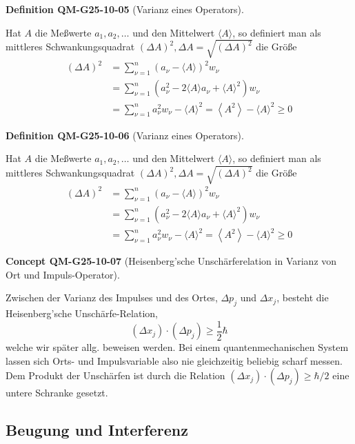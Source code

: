 \documentclass[10pt, letterpaper]{article}
\newcommand{\CustomHeading}[3]{%
  \par\medskip\noindent%
  \textbf{#1 #2} \textnormal{(#3)}.\enskip%
}
\newenvironment{DEF}[2]{\CustomHeading{Definition}{#1}{#2}}{}
\newenvironment{CONC}[2]{\CustomHeading{Concept}{#1}{#2}}{}
\begin{document}
\begin{DEF}{QM-G25-10-05}{Varianz eines Operators}
Hat $A$ die Meßwerte $a_{1}, a_{2}, \ldots$ und den Mittelwert $\langle A\rangle$, so definiert man als mittleres Schwankungsquadrat $(\Delta A)^{2}, \Delta A=\sqrt{(\Delta A)^{2}}$ die Größe
$$
\begin{aligned}
(\Delta A)^{2} & =\sum_{\nu=1}^{n}\left(a_{\nu}-\langle A\rangle\right)^{2} w_{\nu} \\
& =\sum_{\nu=1}^{n}\left(a_{\nu}^{2}-2\langle A\rangle a_{\nu}+\langle A\rangle^{2}\right) w_{\nu} \\
& =\sum_{\nu=1}^{n} a_{\nu}^{2} w_{\nu}-\langle A\rangle^{2}=\left\langle A^{2}\right\rangle-\langle A\rangle^{2} \geq 0
\end{aligned}
$$
\end{DEF}

\begin{DEF}{QM-G25-10-06}{Varianz eines Operators}
Hat $A$ die Meßwerte $a_{1}, a_{2}, \ldots$ und den Mittelwert $\langle A\rangle$, so definiert man als mittleres Schwankungsquadrat $(\Delta A)^{2}, \Delta A=\sqrt{(\Delta A)^{2}}$ die Größe
$$
\begin{aligned}
(\Delta A)^{2} & =\sum_{\nu=1}^{n}\left(a_{\nu}-\langle A\rangle\right)^{2} w_{\nu} \\
& =\sum_{\nu=1}^{n}\left(a_{\nu}^{2}-2\langle A\rangle a_{\nu}+\langle A\rangle^{2}\right) w_{\nu} \\
& =\sum_{\nu=1}^{n} a_{\nu}^{2} w_{\nu}-\langle A\rangle^{2}=\left\langle A^{2}\right\rangle-\langle A\rangle^{2} \geq 0
\end{aligned}
$$
\end{DEF}

\begin{CONC}{QM-G25-10-07}{Heisenberg'sche Unschärferelation in Varianz von Ort und Impuls-Operator}
Zwischen der Varianz des Impulses und des Ortes, $\Delta p_{j}$ und $\Delta x_{j}$, besteht die Heisenberg'sche Unschärfe-Relation,
$$
\left(\Delta x_{j}\right) \cdot\left(\Delta p_{j}\right) \geq \frac{1}{2} \hbar
$$
welche wir später allg. beweisen werden. Bei einem quantenmechanischen System lassen sich Orts- und Impulsvariable also nie gleichzeitig beliebig scharf messen. Dem Produkt der Unschärfen ist durch die Relation $\left(\Delta x_{j}\right) \cdot\left(\Delta p_{j}\right) \geq \hbar / 2$ eine untere Schranke gesetzt.
\end{CONC}

\subsection{Beugung und Interferenz}
\end{document}
